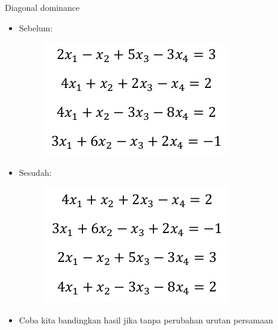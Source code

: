 \documentclass[pdflatex,compress,mathserif]{beamer}
\begin{document}
\begin{frame}{Diagonal dominance}
    \begin{multicols}{2}
        \begin{itemize}
            \item Sebelum:
            \begin{figure}
                \includegraphics[width=\linewidth]{./img/img05.png}
            \end{figure}
            \columnbreak
            \item Sesudah:
            \begin{figure}
                \includegraphics[width=\linewidth]{./img/img03.png}
            \end{figure}
        \end{itemize}
    \end{multicols}
    \begin{itemize}
        \item Coba kita bandingkan hasil jika tanpa perubahan urutan persamaan
    \end{itemize}
\end{frame}
\end{document}
